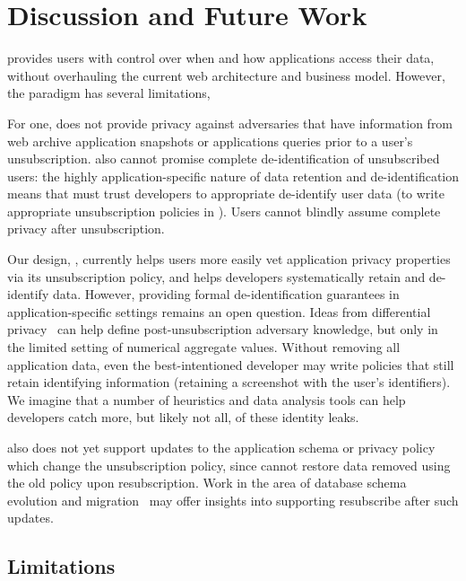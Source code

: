 \section{Discussion and Future Work}
\name provides users with control over when and how applications access their data, without
overhauling the current web architecture and business model. However, the \name paradigm has several limitations,

For one, \name does not provide privacy against adversaries that have information from web archive
application snapshots or applications queries prior to a user's unsubscription. \name also cannot
promise complete de-identification of unsubscribed users: the highly application-specific nature of
data retention and de-identification means that \name must trust developers to appropriate
de-identify user data (\eg to write appropriate unsubscription policies in \sys). Users cannot
blindly assume complete privacy after unsubscription. 

Our design, \sys, currently helps users more easily vet application privacy properties via its unsubscription
policy, and helps developers systematically retain and de-identify data. However, providing formal
de-identification guarantees in application-specific settings remains an open question. Ideas from
differential privacy~\cite{pinq} can help define post-unsubscription adversary knowledge,
but only in the limited setting of numerical aggregate values.  Without removing all application
data, even the best-intentioned developer may write policies that still retain identifying
information (\eg retaining a screenshot with the user's identifiers). We imagine that a number of heuristics and data analysis tools can help developers catch more, but likely not all, of these identity leaks.

\sys also does not yet support updates to the application schema or privacy policy which change the
unsubscription policy, since \sys cannot restore data removed using the old policy upon
resubscription. Work in the area of database schema evolution and migration~\cite{schema:evo}
may offer insights into supporting resubscribe after such updates.

\iffalse
\subsection{Limitations}

